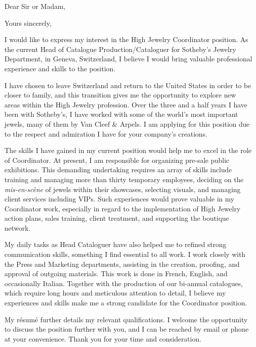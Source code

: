 

\date{June 28, 2014}
\opening{Dear Sir or Madam,}
\closing{Yours sincerely,}
\makelettertitle


I would like to express my interest in the High Jewelry Coordinator position.  As the current Head of Catalogue Production/Cataloguer for Sotheby’s Jewelry Department, in Geneva, Switzerland, I believe I would bring valuable professional experience and skills to the position.


I have chosen to leave Switzerland and return to the United States in order to be closer to family, and this transition gives me the opportunity to explore new areas within the High Jewelry profession. Over the three and a half years I have been with Sotheby’s, I have worked with some of the world's most important jewels, many of them by Van Cleef \& Arpels. I am applying for this position due to the respect and admiration I have for your company's creations.


The skills I have gained in my current position would help me to excel in the role of Coordinator.  At present, I am responsible for organizing pre-sale public exhibitions. This demanding undertaking requires an array of skills include training and managing more than thirty temporary employees, deciding on the \textit{mis-en-sc\`{e}ne} of jewels within their showcases, selecting visuals, and managing client services including VIPs. Such experiences would prove valuable in my Coordinator work, especially in regard to the implementation of High Jewelry action plans, sales training, client treatment, and supporting the boutique network.


My daily tasks as Head Cataloguer have also helped me to refined strong communication skills, something I find essential to all work. I  work closely with the Press and Marketing departments, assisting in the creation, proofing, and approval of outgoing materials. This work is done in French, English, and occasionally Italian. Together with the production of our bi-annual catalogues, which require long hours and meticulous attention to detail, I believe my experiences and skills make me a strong candidate for the Coordinator position.


My r\'{e}sum\'{e} further details my relevant qualifications. I welcome the opportunity to discuss the position further with you, and I can be reached by email or phone at your convenience. Thank you for your time and consideration.


\makeletterclosing


